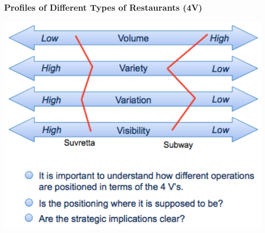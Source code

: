 \subsubsection{Profiles of Different Types of Restaurants (4V)}
\includegraphics[width=1\textwidth]{W01/4v_restaurant}







